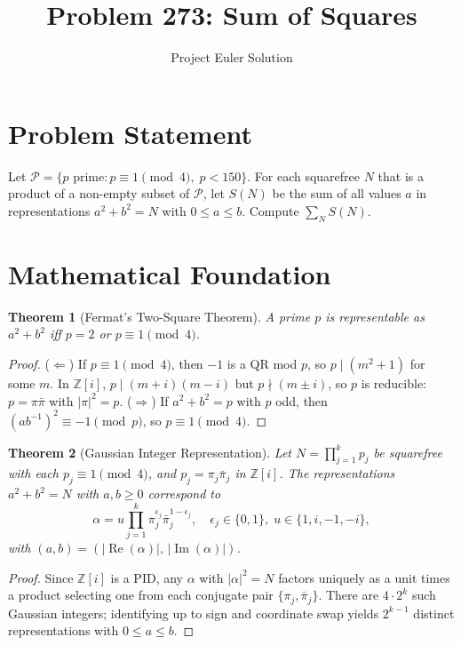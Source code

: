 \documentclass[12pt]{article}
\title{Problem 273: Sum of Squares}
\author{Project Euler Solution}
\date{}
\newtheorem{theorem}{Theorem}
\begin{document}
\maketitle

\section{Problem Statement}
Let $\mathcal{P} = \{p \text{ prime} : p \equiv 1 \pmod{4},\; p < 150\}$. For each squarefree $N$ that is a product of a non-empty subset of $\mathcal{P}$, let $S(N)$ be the sum of all values $a$ in representations $a^2 + b^2 = N$ with $0 \le a \le b$. Compute $\sum_N S(N)$.

\section{Mathematical Foundation}

\begin{theorem}[Fermat's Two-Square Theorem]
A prime $p$ is representable as $a^2 + b^2$ iff $p = 2$ or $p \equiv 1 \pmod{4}$.
\end{theorem}

\begin{proof}
($\Longleftarrow$) If $p \equiv 1 \pmod{4}$, then $-1$ is a QR mod $p$, so $p \mid (m^2+1)$ for some $m$. In $\mathbb{Z}[i]$, $p \mid (m+i)(m-i)$ but $p \nmid (m \pm i)$, so $p$ is reducible: $p = \pi\bar{\pi}$ with $|\pi|^2 = p$. ($\Longrightarrow$) If $a^2 + b^2 = p$ with $p$ odd, then $(ab^{-1})^2 \equiv -1 \pmod{p}$, so $p \equiv 1\pmod{4}$.
\end{proof}

\begin{theorem}[Gaussian Integer Representation]
Let $N = \prod_{j=1}^k p_j$ be squarefree with each $p_j \equiv 1\pmod{4}$, and $p_j = \pi_j \bar{\pi}_j$ in $\mathbb{Z}[i]$. The representations $a^2+b^2=N$ with $a,b \ge 0$ correspond to
\[
\alpha = u \prod_{j=1}^k \pi_j^{\epsilon_j}\bar{\pi}_j^{1-\epsilon_j}, \quad \epsilon_j \in \{0,1\},\; u \in \{1,i,-1,-i\},
\]
with $(a,b) = (|\operatorname{Re}(\alpha)|,\, |\operatorname{Im}(\alpha)|)$.
\end{theorem}

\begin{proof}
Since $\mathbb{Z}[i]$ is a PID, any $\alpha$ with $|\alpha|^2 = N$ factors uniquely as a unit times a product selecting one from each conjugate pair $\{\pi_j, \bar{\pi}_j\}$. There are $4 \cdot 2^k$ such Gaussian integers; identifying up to sign and coordinate swap yields $2^{k-1}$ distinct representations with $0 \le a \le b$.
\end{proof}
\end{document}
